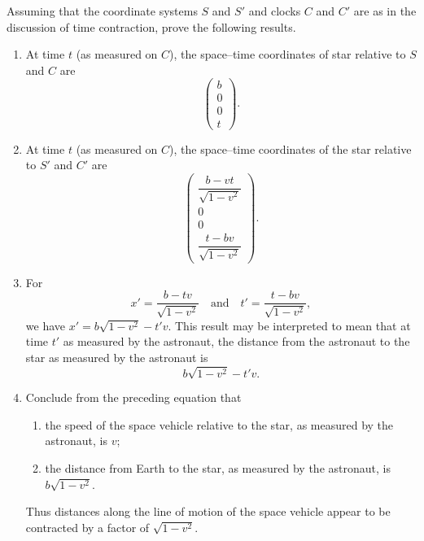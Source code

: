 \begin{ex}
  Assuming that the coordinate systems \(S\) and \(S'\) and clocks \(C\) and \(C'\) are as in the discussion of time contraction, prove the following results.
  \begin{enumerate}
    \item At time \(t\) (as measured on \(C\)), the space--time coordinates of star relative to \(S\) and \(C\) are
          \[
            \begin{pmatrix}
              b \\
              0 \\
              0 \\
              t
            \end{pmatrix}.
          \]
    \item At time \(t\) (as measured on \(C\)), the space--time coordinates of the star relative to \(S'\) and \(C'\) are
          \[
            \begin{pmatrix}
              \dfrac{b - vt}{\sqrt{1 - v^2}} \\
              0                              \\
              0                              \\
              \dfrac{t - bv}{\sqrt{1 - v^2}}
            \end{pmatrix}.
          \]
    \item For
          \[
            x' = \dfrac{b - tv}{\sqrt{1 - v^2}} \quad \text{and} \quad t' = \dfrac{t - bv}{\sqrt{1 - v^2}},
          \]
          we have \(x' = b \sqrt{1 - v^2} - t' v\).
          This result may be interpreted to mean that at time \(t'\) as measured by the astronaut, the distance from the astronaut to the star as measured by the astronaut is
          \[
            b \sqrt{1 - v^2} - t' v.
          \]
    \item Conclude from the preceding equation that
          \begin{enumerate}[label=(\arabic*)]
            \item the speed of the space vehicle relative to the star, as measured by the astronaut, is \(v\);
            \item the distance from Earth to the star, as measured by the astronaut, is \(b \sqrt{1 - v^2}\).
          \end{enumerate}
          Thus distances along the line of motion of the space vehicle appear to be contracted by a factor of \(\sqrt{1 - v^2}\).
  \end{enumerate}
\end{ex}

